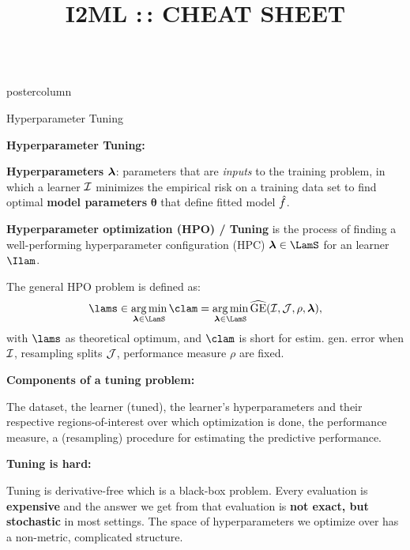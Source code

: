 \documentclass{beamer}
\title{I2ML :\,: CHEAT SHEET} %
\newlength{\columnheight} %
\begin{document}
\begin{frame}[fragile]{}
\begin{columns}
	\begin{column}{.31\textwidth}
		\begin{beamercolorbox}[center]{postercolumn}
			\begin{minipage}{.98\textwidth}
				\parbox[t][\columnheight]{\textwidth}{

        \begin{myblock}{Hyperparameter Tuning}
          \begin{codebox}
            \textbf{Hyperparameter Tuning:}
            \end{codebox}

              \textbf{Hyperparameters} $\bm{\lambda}$: parameters that are \emph{inputs} to the training problem, in which a learner $\mathcal{I}$ minimizes the empirical risk on a training data set to find optimal \textbf{model parameters} $\bm{\theta}$ that define fitted model $\hat{f}$.

\textbf{Hyperparameter optimization (HPO) / Tuning} is the process of finding a well-performing hyperparameter configuration (HPC) $\lamv \in \LamS$ for an learner $\Ilam$.

The general HPO problem is defined as:
$$ \lams \in \argmin_{\lamv \in \LamS} \clam = \argmin_{\lamv \in \LamS} \GEhresa,$$
with $\lams$ as theoretical optimum, and $\clam$ is short for estim. gen. error
when $\mathcal{I}$, resampling splits $\mathcal{J}$, performance measure $\rho$ are fixed.

  \begin{codebox}
\textbf{Components of a tuning problem:}
\end{codebox}
The dataset, the learner (tuned), the learner’s hyperparameters and their respective regions-of-interest over which optimization is done, the performance measure, a (resampling) procedure for estimating the predictive performance.

\begin{codebox}
\textbf{Tuning is hard:}
\end{codebox}

Tuning is derivative-free which is a black-box problem. Every evaluation is \textbf{expensive} and the answer we get from that evaluation is \textbf{not exact, but stochastic} in most settings. The space of hyperparameters we optimize over has a non-metric, complicated structure.

\end{myblock}

}
\end{minipage}
\end{beamercolorbox}
\end{column}
\end{columns}
\end{frame}
\end{document}

